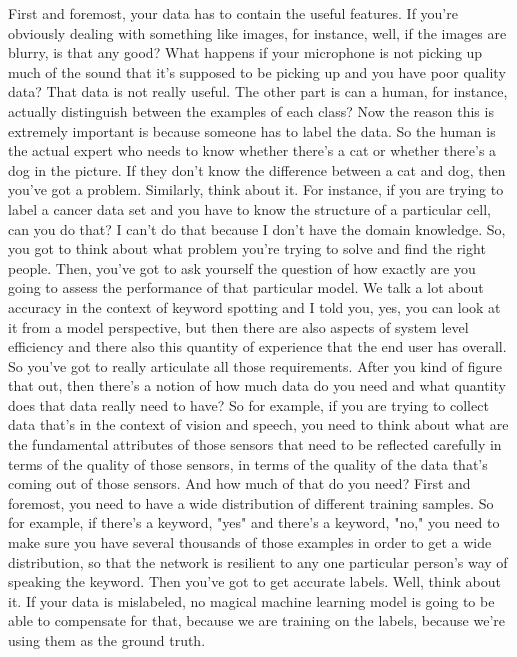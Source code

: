 First and foremost, your data has to contain the useful features.
If you're obviously dealing with something like images,
for instance, well, if the images are blurry, is that any good?
What happens if your microphone is not picking up much of the sound
that it's supposed to be picking up and you have poor quality data?
That data is not really useful.
The other part is can a human, for instance,
actually distinguish between the examples of each class?
Now the reason this is extremely important
is because someone has to label the data.
So the human is the actual expert who needs to know whether there's a cat
or whether there's a dog in the picture.
If they don't know the difference between a cat and dog,
then you've got a problem.
Similarly, think about it.
For instance, if you are trying to label a cancer data set
and you have to know the structure of a particular cell, can you do that?
I can't do that because I don't have the domain knowledge.
So, you got to think about what problem you're trying
to solve and find the right people.
Then, you've got to ask yourself the question
of how exactly are you going to assess the performance
of that particular model.
We talk a lot about accuracy in the context of keyword spotting
and I told you, yes, you can look at it from a model perspective,
but then there are also aspects of system level efficiency
and there also this quantity of experience
that the end user has overall.
So you've got to really articulate all those requirements.
After you kind of figure that out, then there's
a notion of how much data do you need and what quantity
does that data really need to have?
So for example, if you are trying to collect
data that's in the context of vision and speech,
you need to think about what are the fundamental attributes of those sensors
that need to be reflected carefully in terms of the quality of those sensors,
in terms of the quality of the data that's coming out of those sensors.
And how much of that do you need?
First and foremost, you need to have a wide distribution of different training
samples.
So for example, if there's a keyword, "yes" and there's a keyword, "no,"
you need to make sure you have several thousands of those examples
in order to get a wide distribution, so that the network is
resilient to any one particular person's way of speaking the keyword.
Then you've got to get accurate labels.
Well, think about it.
If your data is mislabeled, no magical machine learning model
is going to be able to compensate for that,
because we are training on the labels, because we're
using them as the ground truth.
